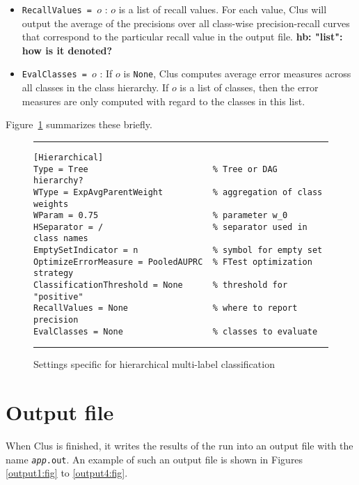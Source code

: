 \begin{itemize}
{\bf * hb: is the set of thresholds indeed written as a set, i.e. between curly braces?  And is it really $>t$, or $\geq t$?}
\item {\tt RecallValues = $o$} : $o$ is a list of recall values. For each value, Clus will output the average of the precisions over all class-wise precision-recall curves that correspond to the particular recall value in the output file.
{\bf * hb: "list": how is it denoted?}
\item {\tt EvalClasses = $o$} : If $o$ is {\tt None}, Clus computes average error measures across all classes in the class  hierarchy. If $o$ is a list of classes, then the error measures are only computed with regard to the classes in this list.
\end{itemize}

Figure~\ref{settings-hmc:fig} summarizes these briefly.

\begin{figure}
\hrule
\begin{verbatim}
[Hierarchical]
Type = Tree                         % Tree or DAG hierarchy?
WType = ExpAvgParentWeight          % aggregation of class weights
WParam = 0.75                       % parameter w_0
HSeparator = /                      % separator used in class names
EmptySetIndicator = n               % symbol for empty set
OptimizeErrorMeasure = PooledAUPRC  % FTest optimization strategy
ClassificationThreshold = None      % threshold for "positive"
RecallValues = None                 % where to report precision
EvalClasses = None                  % classes to evaluate
\end{verbatim}
\hrule
\caption{Settings specific for hierarchical multi-label classification}
\label{settings-hmc:fig}
\end{figure}

\chapter{Output file}

When Clus is finished, it writes the results of the run into an output file with the name
{\tt {\em app}.out}.  An example of such an output file is shown in Figures \ref{output1:fig} to \ref{output4:fig}.

